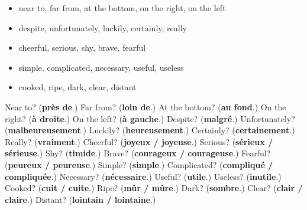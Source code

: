 \begin{itemize}
\raggedright
  \item near to, far from, at the bottom, on the right, on the left
  \item despite, unfortunately, luckily, certainly, really
  \item cheerful, serious, shy, brave, fearful
  \item simple, complicated, necessary, useful, useless
  \item cooked, ripe, dark, clear, distant
\end{itemize}

\begin{tcolorbox}[breakable,colback=teal!4,colframe=teal!35!black,title={Before you move on}]
Near to? (\textbf{près de}.) Far from? (\textbf{loin de}.) At the bottom? (\textbf{au fond}.) On the right? (\textbf{à droite}.) On the left? (\textbf{à gauche}.) Despite? (\textbf{malgré}.) Unfortunately? (\textbf{malheureusement}.) Luckily? (\textbf{heureusement}.) Certainly? (\textbf{certainement}.) Really? (\textbf{vraiment}.) Cheerful? (\textbf{joyeux / joyeuse}.) Serious? (\textbf{sérieux / sérieuse}.) Shy? (\textbf{timide}.) Brave? (\textbf{courageux / courageuse}.) Fearful? (\textbf{peureux / peureuse}.) Simple? (\textbf{simple}.) Complicated? (\textbf{compliqué / compliquée}.) Necessary? (\textbf{nécessaire}.) Useful? (\textbf{utile}.) Useless? (\textbf{inutile}.) Cooked? (\textbf{cuit / cuite}.) Ripe? (\textbf{mûr / mûre}.) Dark? (\textbf{sombre}.) Clear? (\textbf{clair / claire}.) Distant? (\textbf{lointain / lointaine}.)
\end{tcolorbox}
